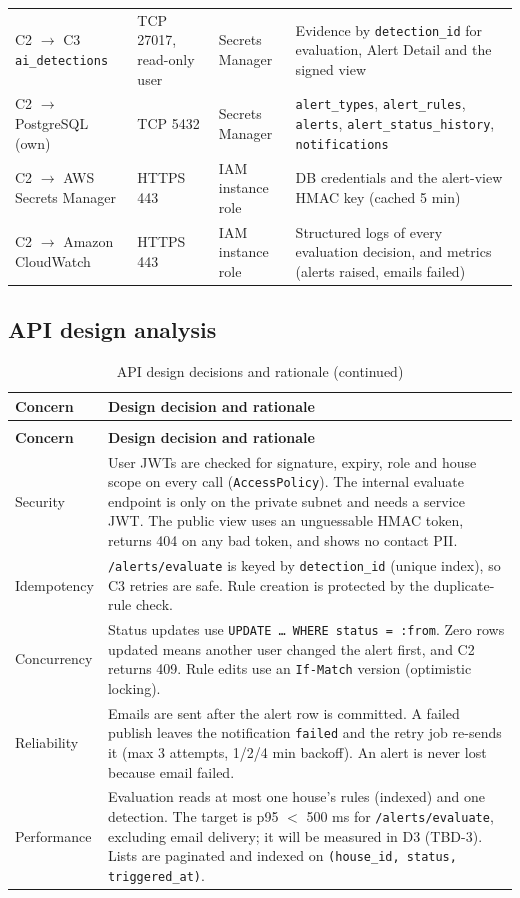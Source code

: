 \begin{longtable}{L{3.4cm}L{2.6cm}L{2.2cm}L{6.4cm}}
C2 $\rightarrow$ C3 \texttt{ai\_detections} & TCP 27017, read-only user & Secrets Manager & Evidence by \texttt{detection\_id} for evaluation, Alert Detail and the signed view \\
C2 $\rightarrow$ PostgreSQL (own) & TCP 5432 & Secrets Manager & \texttt{alert\_types}, \texttt{alert\_rules}, \texttt{alerts}, \texttt{alert\_status\_history}, \texttt{notifications} \\
C2 $\rightarrow$ AWS Secrets Manager & HTTPS 443 & IAM instance role & DB credentials and the alert-view HMAC key (cached 5 min) \\
C2 $\rightarrow$ Amazon CloudWatch & HTTPS 443 & IAM instance role & Structured logs of every evaluation decision, and metrics (alerts raised, emails failed) \\
\bottomrule
\end{longtable}

\subsection{API design analysis}
\begin{longtable}{L{3.0cm}L{11.8cm}}
\caption{API design decisions and rationale}\\
\toprule
\textbf{Concern} & \textbf{Design decision and rationale} \\
\midrule
\endfirsthead
\caption[]{API design decisions and rationale (continued)}\\
\toprule
\textbf{Concern} & \textbf{Design decision and rationale} \\
\midrule
\endhead
Security & User JWTs are checked for signature, expiry, role and house scope on every call (\texttt{AccessPolicy}). The internal evaluate endpoint is only on the private subnet and needs a service JWT. The public view uses an unguessable HMAC token, returns 404 on any bad token, and shows no contact PII. \\
Idempotency & \texttt{/alerts/evaluate} is keyed by \texttt{detection\_id} (unique index), so C3 retries are safe. Rule creation is protected by the duplicate-rule check. \\
Concurrency & Status updates use \texttt{UPDATE \ldots{} WHERE status = :from}. Zero rows updated means another user changed the alert first, and C2 returns 409. Rule edits use an \texttt{If-Match} version (optimistic locking). \\
Reliability & Emails are sent after the alert row is committed. A failed publish leaves the notification \texttt{failed} and the retry job re-sends it (max 3 attempts, 1/2/4 min backoff). An alert is never lost because email failed. \\
Performance & Evaluation reads at most one house's rules (indexed) and one detection. The target is p95 $<$ 500 ms for \texttt{/alerts/evaluate}, excluding email delivery; it will be measured in D3 (TBD-3). Lists are paginated and indexed on \texttt{(house\_id, status, triggered\_at)}. \\
\bottomrule
\end{longtable}

